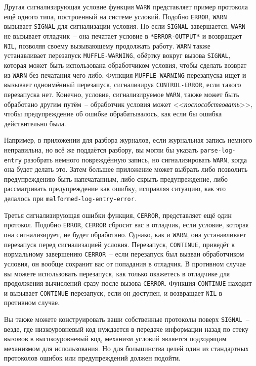 Другая сигнализирующая условие функция \lstinline{WARN} представляет пример протокола ещё
одного типа, построенный на системе условий. Подобно \lstinline{ERROR}, \lstinline{WARN}
вызывает \lstinline{SIGNAL} для сигнализации условия. Но если \lstinline{SIGNAL}
завершается, \lstinline{WARN} не вызывает отладчик~-- она печатает условие в
\lstinline{*ERROR-OUTPUT*} и возвращает \lstinline{NIL}, позволяя своему вызывающему
продолжать работу. \lstinline{WARN} также устанавливает перезапуск
\lstinline{MUFFLE-WARNING}, обёртку вокруг вызова \lstinline{SIGNAL}, которая может быть
использована обработчиком условия, чтобы сделать возврат из \lstinline{WARN} без печатания
чего-либо. Функция \lstinline{MUFFLE-WARNING} перезапуска ищет и вызывает одноимённый
перезапуск, сигнализируя \lstinline{CONTROL-ERROR}, если такого перезапуска нет. Конечно,
условие, сигнализируемое \lstinline{WARN}, также может быть обработано другим путём~--
обработчик условия может <<\textit{поспособствовать}>>, чтобы предупреждение об ошибке
обрабатывалось, как если бы ошибка действительно была.

Например, в приложении для разбора журналов, если журнальная запись немного неправильна, но
всё же поддаётся разбору, вы могли бы указать \lstinline{parse-log-entry} разобрать немного
повреждённую запись, но сигнализировать \lstinline{WARN}, когда она будет делать это. Затем
большее приложение может выбрать либо позволить предупреждению быть напечатанным, либо
скрыть предупреждение, либо рассматривать предупреждение как ошибку, исправляя ситуацию,
как это делалось при \lstinline{malformed-log-entry-error}.

Третья сигнализирующая ошибки функция, \lstinline{CERROR}, представляет ещё один протокол.
Подобно \lstinline{ERROR}, \lstinline{CERROR} сбросит вас в отладчик, если условие, которая она
сигнализирует, не будет обработано. Однако, как и \lstinline{WARN}, она устанавливает перезапуск
перед сигнализацией условия. Перезапуск, \lstinline{CONTINUE}, приведёт к нормальному
завершению \lstinline{CERROR}~-- если перезапуск был вызван обработчиком условия, он вообще
сохранит вас от попадания в отладчик. В противном случае вы можете использовать
перезапуск, как только окажетесь в отладчике для продолжения вычислений сразу после вызова
\lstinline{CERROR}. Функция \lstinline{CONTINUE} находит и вызывает \lstinline{CONTINUE} перезапуск, если
он доступен, и возвращает \lstinline{NIL} в противном случае.

Вы также можете конструировать ваши собственные протоколы поверх \lstinline{SIGNAL}~-- везде,
где низкоуровневый код нуждается в передаче информации назад по стеку вызовов в
высокоуровневый код, механизм условий является подходящим механизмом для использования. Но
для большинства целей один из стандартных протоколов ошибок или предупреждений должен
подойти.

